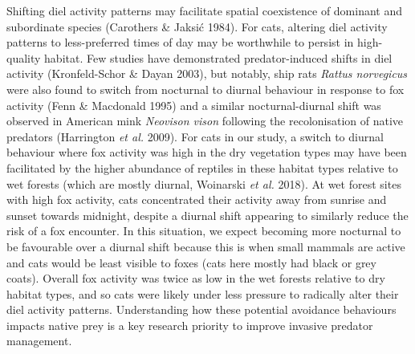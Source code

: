 \documentclass[11pt,a4paper,titlepage,twoside,openright]{style/unimelbthesis}
\begin{document}
\begin{mainmatter}
Shifting diel activity patterns may facilitate spatial coexistence of dominant and subordinate species (Carothers \& Jaksić 1984). For cats, altering diel activity patterns to less-preferred times of day may be worthwhile to persist in high-quality habitat. Few studies have demonstrated predator-induced shifts in diel activity (Kronfeld-Schor \& Dayan 2003), but notably, ship rats \emph{Rattus norvegicus} were also found to switch from nocturnal to diurnal behaviour in response to fox activity (Fenn \& Macdonald 1995) and a similar nocturnal-diurnal shift was observed in American mink \emph{Neovison vison} following the recolonisation of native predators (Harrington \emph{et al.} 2009). For cats in our study, a switch to diurnal behaviour where fox activity was high in the dry vegetation types may have been facilitated by the higher abundance of reptiles in these habitat types relative to wet forests (which are mostly diurnal, Woinarski \emph{et al.} 2018). At wet forest sites with high fox activity, cats concentrated their activity away from sunrise and sunset towards midnight, despite a diurnal shift appearing to similarly reduce the risk of a fox encounter. In this situation, we expect becoming more nocturnal to be favourable over a diurnal shift because this is when small mammals are active and cats would be least visible to foxes (cats here mostly had black or grey coats). Overall fox activity was twice as low in the wet forests relative to dry habitat types, and so cats were likely under less pressure to radically alter their diel activity patterns. Understanding how these potential avoidance behaviours impacts native prey is a key research priority to improve invasive predator management.


\end{mainmatter}
\end{document}
